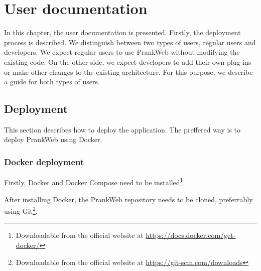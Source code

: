 \chapter{User documentation}
\label{chap:user_docs}

In this chapter, the user documentation is presented. Firstly, the deployment process is described. We distinguish between two types of users, regular users and developers. We expect regular users to use PrankWeb without modifying the existing code. On the other side, we expect developers to add their own plug-ins or make other changes to the existing architecture. For this purpose, we describe a guide for both types of users.


\section{Deployment}
\label{sec:deployment}

This section describes how to deploy the application. The preffered way is to deploy PrankWeb using Docker.

\subsection{Docker deployment}
\label{subsec:docker_deployment}

Firstly, Docker and Docker Compose need to be installed\footnote{Downloadable from the official website at \url{https://docs.docker.com/get-docker/}}. 

After installing Docker, the PrankWeb repository needs to be cloned, preferrably using Git\footnote{Downloadable from the official website at \url{https://git-scm.com/downloads}}.

